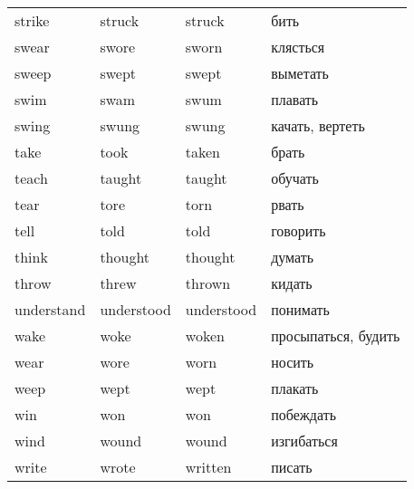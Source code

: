 \begin{longtable}{| m{} | m{} | m{} | m{} |}
    strike             & struck              & struck                  & бить                \\
    swear              & swore               & sworn                   & клясться            \\
    sweep              & swept               & swept                   & выметать            \\
    swim               & swam                & swum                    & плавать             \\
    swing              & swung               & swung                   & качать, вертеть     \\
    take               & took                & taken                   & брать               \\
    teach              & taught              & taught                  & обучать             \\
    tear               & tore                & torn                    & рвать               \\
    tell               & told                & told                    & говорить            \\
    think              & thought             & thought                 & думать              \\
    throw              & threw               & thrown                  & кидать              \\
    understand         & understood          & understood              & понимать            \\
    wake               & woke                & woken                   & просыпаться, будить \\
    wear               & wore                & worn                    & носить              \\
    weep               & wept                & wept                    & плакать             \\
    win                & won                 & won                     & побеждать           \\
    wind               & wound               & wound                   & изгибаться          \\
    write              & wrote               & written                 & писать              \\
\end{longtable}

